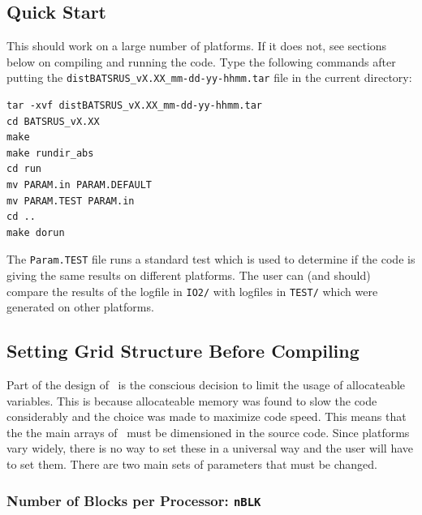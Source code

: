 \subsection{Quick Start \label{section:quick_start}}

This should work on a large number of platforms. If it does not,
see sections below on compiling and running the code. Type the following
commands after putting the {\tt distBATSRUS\_vX.XX\_mm-dd-yy-hhmm.tar} file 
in the current directory:
\begin{verbatim}
tar -xvf distBATSRUS_vX.XX_mm-dd-yy-hhmm.tar
cd BATSRUS_vX.XX
make
make rundir_abs
cd run
mv PARAM.in PARAM.DEFAULT
mv PARAM.TEST PARAM.in
cd ..
make dorun
\end{verbatim}
The 
{\tt Param.TEST} file runs a standard test which is used to determine
if the code is giving the same results on different platforms.  The
user can (and should) compare the results of the logfile in {\tt IO2/} with 
logfiles in {\tt TEST/} which were generated on other platforms.


\subsection{Setting Grid Structure Before Compiling \BATSRUS\ \label{section:before_compile}}

Part of the design of \BATSRUS\ is the conscious decision to limit the
usage of allocateable variables.  This is because
allocateable memory was found to slow the code considerably and 
the choice was made to maximize code speed.  This means that the
the main arrays of \BATSRUS\ must be dimensioned in the source code.
Since platforms vary widely, there is no way to set these in a universal
way and the user will have to set them.  There are two main sets of 
parameters that must be changed.

\subsubsection{Number of Blocks per Processor: {\tt nBLK} \label{section:nblk}}

